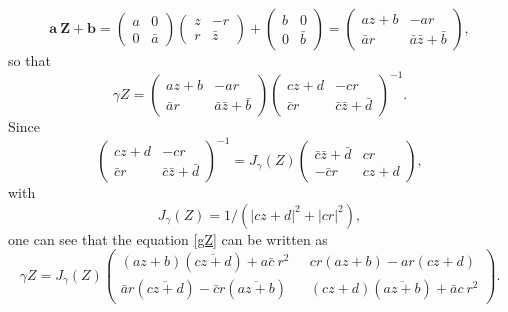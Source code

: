 \documentclass[a4paper,11pt]{article}
\begin{document}
\begin{equation}
\mathbf{a}~\mathbf{Z} + \mathbf{b} = \begin{pmatrix}
a & 0 \\
0 & \bar{a}
\end{pmatrix}\begin{pmatrix}
z & -r \\
r & \bar{z} 
\end{pmatrix}+\begin{pmatrix}
b & 0 \\
0 & \bar{b}
\end{pmatrix} = \begin{pmatrix}
a z+b & -a r \\
\bar{a} r & \bar{a} \bar{z}+\bar{b}
\end{pmatrix},
\end{equation}
so that
\begin{equation}\label{gZ}
\gamma Z = \begin{pmatrix}
a z+b & -a r \\
\bar{a} r & \bar{a} \bar{z}+\bar{b}
\end{pmatrix}\begin{pmatrix}
c z+d & -c r \\
\bar{c} r & \bar{c} \bar{z}+\bar{d}
\end{pmatrix}^{-1}.
\end{equation}
Since
\begin{equation}
\begin{pmatrix}
c z+d & -c r \\
\bar{c} r & \bar{c} \bar{z}+\bar{d}
\end{pmatrix}^{-1} = J_{\gamma}(Z) \begin{pmatrix}
\bar{c} \bar{z}+\bar{d} & c r \\
-\bar{c} r & c z + d
\end{pmatrix},
\end{equation}
with  
\begin{equation}
J_{\gamma}(Z) =1/\left(|c z +d|^2+|c r|^2\right),\label{Jgammaz}
\end{equation}
one can see that the equation \eqref{gZ} can be written as
\begin{equation}
\gamma Z = J_{\gamma}(Z) \begin{pmatrix}
(a z +b)(\overline{c z +d})+ a \bar{c}~r^2 ~~~& c r (a z +b)- a r (c z +d) \\
\bar{a} r (\overline{c z +d})-\bar{c} r(\overline{a z +b}) & (c z + d)(\overline{a z +b})+ \bar{a} c~r^2
\end{pmatrix}.
\end{equation}
\end{document}
